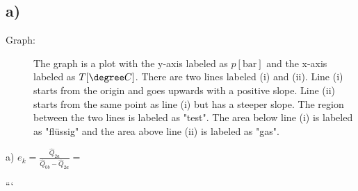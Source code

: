 

\subsection*{a)}

\begin{description}
    \item[Graph:] The graph is a plot with the y-axis labeled as \( p[\text{bar}] \) and the x-axis labeled as \( T[\degree C] \). There are two lines labeled (i) and (ii). Line (i) starts from the origin and goes upwards with a positive slope. Line (ii) starts from the same point as line (i) but has a steeper slope. The region between the two lines is labeled as "test". The area below line (i) is labeled as "flüssig" and the area above line (ii) is labeled as "gas".
\end{description}

a) \( e_k = \frac{\hat{Q}_{2a}}{\hat{Q}_{0b} - \hat{Q}_{2a}} = \)

```